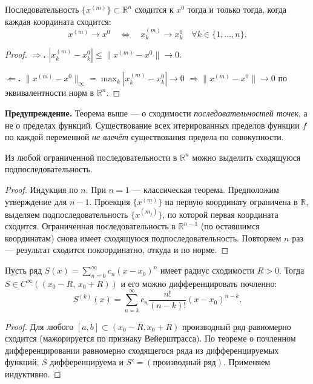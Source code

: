 \begin{theorem}
  \label{thm:coord_convergence}
  Последовательность $\{x^{(m)}\} \subset \mathbb{R}^n$ сходится к $x^0$ тогда и только тогда,
  когда каждая координата сходится:
  \[
    x^{(m)} \to x^0 \quad\Longleftrightarrow\quad
    x^{(m)}_k \to x^0_k \quad\forall k \in \{1,\ldots,n\}.
  \]
  \begin{proof}
    \textbf{$\Rightarrow$.} $|x^{(m)}_k - x^0_k| \leq \|x^{(m)}-x^0\| \to 0$.

    \textbf{$\Leftarrow$.} $\|x^{(m)}-x^0\|_\infty = \max_k |x^{(m)}_k - x^0_k| \to 0$
    $\Rightarrow \|x^{(m)}-x^0\| \to 0$ по эквивалентности норм в $\mathbb{R}^n$. \qedhere
  \end{proof}
\end{theorem}

\begin{note}
  \textbf{Предупреждение.} Теорема выше --- о сходимости \emph{последовательностей точек},
  а не о пределах функций. Существование всех итерированных пределов функции $f$ по каждой переменной
  \emph{не влечёт} существования предела по совокупности.
\end{note}

\begin{theorem}
  Из любой ограниченной последовательности в $\mathbb{R}^n$ можно выделить сходящуюся подпоследовательность.
  \begin{proof}
    Индукция по $n$. При $n=1$ --- классическая теорема.
    Предположим утверждение для $n-1$. Проекция $\{x^{(m)}\}$ на первую координату ограничена в $\mathbb{R}$,
    выделяем подпоследовательность $\{x^{(m_j)}\}$, по которой первая координата сходится.
    Ограниченная последовательность в $\mathbb{R}^{n-1}$ (по оставшимся координатам) снова имеет
    сходящуюся подпоследовательность. Повторяем $n$ раз --- результат сходится покоординатно, откуда и по норме. \qedhere
  \end{proof}
\end{theorem}


\begin{theorem}
  Пусть ряд $S(x) = \sum_{n=0}^\infty c_n(x-x_0)^n$ имеет радиус сходимости $R > 0$.
  Тогда $S \in C^\infty((x_0-R,\, x_0+R))$ и его можно дифференцировать почленно:
  \[
    S^{(k)}(x) = \sum_{n=k}^\infty c_n \frac{n!}{(n-k)!}(x-x_0)^{n-k}.
  \]
  \begin{proof}
    Для любого $[a,b] \subset (x_0-R, x_0+R)$ производный ряд равномерно сходится
    (мажорируется по признаку Вейерштрасса). По теореме о почленном дифференцировании равномерно
    сходящегося ряда из дифференцируемых функций, $S$ дифференцируема и $S' = (\text{производный ряд})$.
    Применяем индуктивно. \qedhere
  \end{proof}
\end{theorem}

